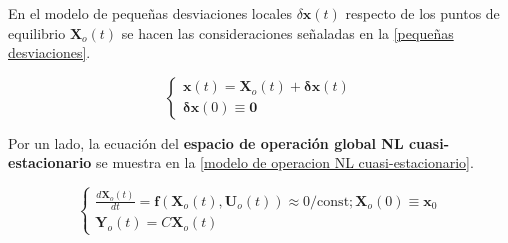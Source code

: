 \documentclass[a4paper, 10pt, onecolumn,journal]{ieeeconf}
\begin{document}
En el modelo de pequeñas desviaciones locales $\delta \mathbf{x}(t)$ respecto de los puntos de equilibrio $\mathbf{X}_o(t)$
se hacen las consideraciones señaladas en la \cref{pequeñas desviaciones}.

\begin{equation}
    \begin{cases}
    \mathbf{x}(t)  = \mathbf{X}_o(t) + \mathbf{\delta x}(t)\\
    \mathbf{\delta x}(0) \equiv \mathbf{0}
    \end{cases}
    \label{pequeñas desviaciones}
\end{equation}

Por un lado, la ecuación del \textbf{espacio de operación global NL cuasi-estacionario} se muestra en la \cref{modelo de operacion NL cuasi-estacionario}.

\begin{equation}
    \begin{cases}
    \frac{d\mathbf{X}_o(t)}{dt} =  \mathbf{f}(\mathbf{X}_o(t), \mathbf{U}_o(t)) \approx 0/\text{const};  \mathbf{X}_o(0) \equiv \mathbf{x}_0\\
    \mathbf{Y}_o(t) = C \mathbf{X}_o(t)
    \end{cases}
    \label{modelo de operacion NL cuasi-estacionario}
\end{equation}
\end{document}
